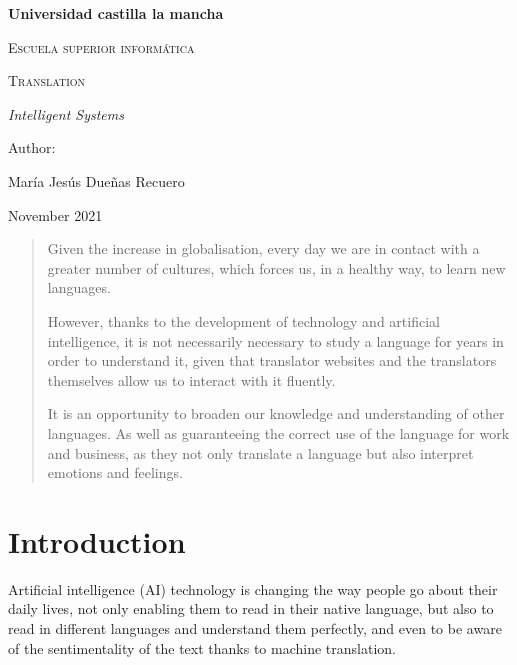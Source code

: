 \documentclass[a4paper]{article}
\theoremstyle{plain}
\theoremstyle{definition}
\begin{document}
\begin{titlepage}
    \centering
    {\bfseries\LARGE Universidad castilla la mancha\par}
    \vspace{1cm}
    {\scshape\Large Escuela superior informática\par}
    \vspace{2cm}
    {\scshape\Huge Translation \par}
    \vspace{2cm}
    {\itshape\Large Intelligent Systems \par}
    \vfill
    {\Large Author: \par}
    {\Large María Jesús Dueñas Recuero\par}
    \vfill
    {\Large November 2021 \par}
    
   
\end{titlepage}
\begin{abstract}
    Given the increase in globalisation, every day we are in contact with a greater number of cultures, which forces us, in a healthy way, to learn new languages.\par

	However, thanks to the development of technology and artificial intelligence, it is not necessarily necessary to study a language for years in order to understand it, given that translator websites and the translators themselves allow us to interact with it fluently.\par

	It is an opportunity to broaden our knowledge and understanding of other languages. As well as guaranteeing the correct use of the language for work and business, as they not only translate a language but also interpret emotions and feelings.
\end{abstract}

	\newpage
	
	\tableofcontents
	\newpage
	\section{Introduction}
	\label{sec:intro}
	Artificial intelligence (AI) technology is changing the way people go about their daily lives, not only enabling them to read in their native language, but also to read in different languages and understand them perfectly, and even to be aware of the sentimentality of the text thanks to machine translation.\par
\end{document}
